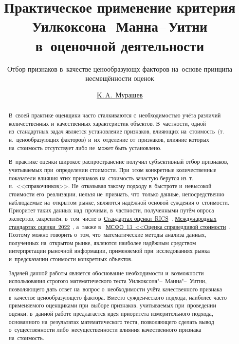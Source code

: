 \documentclass[]{scrreprt}
\title{Практическое применение критерия Уилкоксона--\,Манна--\,Уитни в~оценочной деятельности}
\subtitle{Отбор признаков в~качестве ценообразующх факторов на~основе принципа несмещённости оценок}
\author{\href{https://www.facebook.com/groups/1977067932456703}{K.\,A.~{Мурашев}}}
\begin{document}
	
\maketitle
%
%	
\begin{abstract}
	В~своей практике оценщики часто сталкиваются с~необходимостью учёта различий количественных и~качественных характеристик объектов. В~частности, одной из~стандартных задач является установление признаков, влияющих на~стоимость~(т.\,н.~ценообразующих факторов) и~их~отделение от~признаков, влияние которых на~стоимость отсутствует либо не~может быть установлено.
	
	В~практике оценки широкое распространение получил субъективный отбор признаков, учитываемых при~определении стоимости. При~этом конкретные количественные показатели влияния этих признаков на~стоимость зачастую берутся из~т.\,н.~<<справочников>>. Не~отказывая такому подходу в~быстроте и~невысокой стоимости его~реализации, нельзя не~признать, что~только данные, непосредственно наблюдаемые на~открытом рынке, являются надёжной основой суждения о~стоимости. Приоритет таких данных над~прочими, в~частности, полученными путём опроса экспертов, закреплён, в~том~числе в~\href{https://www.rics.org/uk/upholding-professional-standards/sector-standards/valuation/red-book/red-book-global/}{Стандартах оценки~RICS}~\cite{RVGS-2022}, \href{https://www.rics.org/uk/upholding-professional-standards/sector-standards/valuation/red-book/international-valuation-standards/}{Международных стандартах оценки~2022}~\cite{IVS-2022}, а~также в~ \href{https://normativ.kontur.ru/document?moduleId=1&documentId=326168#l0}{МСФО~13~<<Оценка справедливой стоимости}~\cite{MSFO-13}. Поэтому можно говорить о~том, что~математические методы анализа данных, полученных на~открытом рынке, являются наиболее надёжным средством интерпретации рыночной информации, применяемой при~исследованиях рынка и~предсказании стоимости конкретных объектов.
	
	Задачей данной работы является обоснование необходимости и~возможности использования строгого математического теста Уилкоксона"--~Манна"--~Уитни, позволяющего дать ответ на~вопрос о~необходимости учёта качественного признака в~качестве ценообразующего фактора. Вместо сужденческого подхода, наиболее часто применяемого оценщиками при~выборе признаков, учитываемых при~проведении оценки, в~данной работе предлагается идея приоритета измерительного подхода, основанного на~результатах математического теста, позволяющего сделать вывод о~существенности либо~несущественности влияния качественного признака на~стоимость.
	

\end{abstract}
\end{document}
